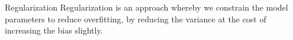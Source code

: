 \ifdefined\wox \begin{frame} \titlepage \end{frame} \fi


\begin{frame}{Regularization}
%
%
%
%
Regularization is an approach whereby we constrain the model parameters
to reduce overfitting, by reducing the variance
at the cost of increasing the bias slightly. 

\end{frame}
